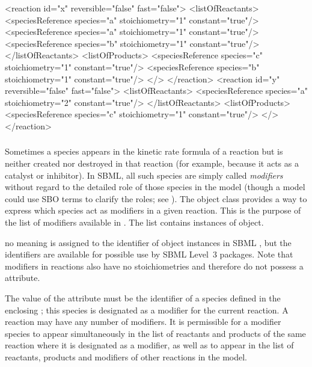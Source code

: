 \begin{example}
<reaction id="x" reversible="false" fast="false">
    <listOfReactants>
        <speciesReference species="a" stoichiometry="1" constant="true"/>
        <speciesReference species="a" stoichiometry="1" constant="true"/>
        <speciesReference species="b" stoichiometry="1" constant="true"/>
    </listOfReactants>
    <listOfProducts>
        <speciesReference species="c" stoichiometry="1" constant="true"/>
        <speciesReference species="b" stoichiometry="1" constant="true"/>
    </>
</reaction>
<reaction id="y" reversible="false" fast="false">
    <listOfReactants>
        <speciesReference species="a" stoichiometry="2" constant="true"/>
    </listOfReactants>
    <listOfProducts>
        <speciesReference species="c" stoichiometry="1" constant="true"/>
    </>
</reaction>
\end{example}



\subsubsection{}
\label{subsec:modifierreference}

Sometimes a species appears in the kinetic rate formula of a
reaction but is neither created nor destroyed in that reaction
(for example, because it acts as a catalyst or inhibitor).  In
SBML, all such species are simply called \emph{modifiers} without
regard to the detailed role of those species in the model (though
a model could use SBO terms to clarify the roles; see
).  The \Reaction object class provides a way
to express which species act as modifiers in a given reaction.
This is the purpose of the list of modifiers available in
\Reaction.  The list contains instances of
\ModifierSpeciesReference object.

 no meaning is
assigned to the identifier of \ModifierSpeciesReference object
instances in SBML \thisLV, but the identifiers are available for
possible use by SBML Level~3 packages.  Note that modifiers
in reactions also have no stoichiometries and therefore do not
possess a  attribute.

The value of the  attribute must be the identifier of a
species defined in the enclosing \Model; this species is
designated as a modifier for the current reaction.  A reaction may
have any number of modifiers.  It is permissible for a modifier
species to appear simultaneously in the list of reactants and
products of the same reaction where it is designated as a
modifier, as well as to appear in the list of reactants, products
and modifiers of other reactions in the model.


